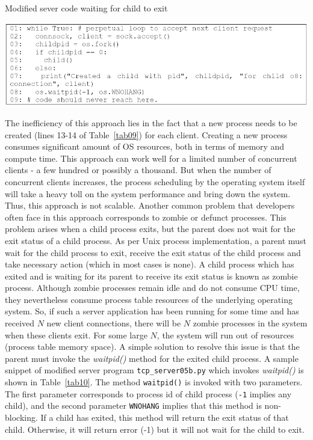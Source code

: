 \begin{table}[H]

\vspace{-.8cm}

\centering
\caption{Modified sever code waiting for child to exit}\label{tab10}
\includegraphics[scale=2.35]{src/Figures/chap1/tab10.jpg}
\end{table}

\begin{multicols}{2}

\vspace{-.7cm}

The inefficiency of this approach lies in the fact that a new process needs to be created (lines 13-14 of Table~\ref{tab09}) for each client. Creating a new process consumes significant amount of OS resources, both in terms of memory and compute time. This approach can work well for a limited number of concurrent clients - a few hundred or possibly a thousand. But when the number of concurrent clients increases, the process scheduling by the operating system itself will take a heavy toll on the system performance and bring down the system. Thus, this approach is not scalable. Another common problem that developers often face in this approach corresponds to zombie or defunct processes. This problem arises when a child process exits, but the parent does not wait for the exit status of a child process. As per Unix process implementation, a parent must wait for the child process to exit, receive the exit status of the child process and take necessary action (which in most cases is none). A child process which has exited and is waiting for its parent to receive its exit status is known as zombie process. Although zombie processes remain idle and do not consume CPU time, they nevertheless consume process table resources of the underlying operating system. So, if such a server application has been running for some time and has received $N$ new client connections, there will be $N$ zombie processes in the system when these clients exit. For some large $N$, the system will run out of resources (process table memory space). A simple solution to resolve this issue is that the parent must invoke the \textit{waitpid()} method for the exited child process. A sample snippet of modified server program \texttt{tcp\_server05b.py} \cite{art1-key17} which invokes \textit{waitpid()} is shown in Table~\ref{tab10}. The method \texttt{waitpid()} is invoked with two parameters. The first parameter corresponds to process id of child process (\texttt{-1} implies any child), and the second parameter \texttt{WNOHANG} implies that this method is non-blocking. If a child has exited, this method will return the exit status of that child. Otherwise, it will return error (-1) but it will not wait for the child to exit.
\end{multicols}


